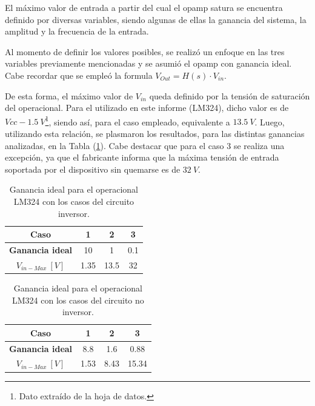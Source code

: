 El máximo valor de entrada a partir del cual el opamp satura se encuentra definido por diversas variables, siendo algunas de ellas la ganancia del sistema, la amplitud y la frecuencia de la entrada.

Al momento de definir los valores posibles, se realizó un enfoque en las tres variables previamente mencionadas y se asumió el opamp con ganancia ideal. Cabe recordar que se empleó la formula $ V_{Out}=H(s)\cdot V_{in} $.

De esta forma, el máximo valor de $V_{in}$ queda definido por la tensión de saturación del operacional. Para el utilizado en este informe (LM324), dicho valor es de $Vcc - 1.5 \ V$\footnote{Dato extraído de la hoja de datos.}, siendo así, para el caso empleado, equivalente a $13.5 \ V$. Luego, utilizando esta relación, se plasmaron los resultados, para las distintas ganancias analizadas, en la Tabla (\ref{tab:gananciaideal}). Cabe destacar que para el caso 3 se realiza una excepción, ya que el fabricante informa que la máxima tensión de entrada soportada por el dispositivo sin quemarse es de $32 \ V$.

\begin{table}[H]
\begin{center}
\label{tab:maxin}
\begin{tabular}{|c|c|c|c|}
\hline
\textbf{Caso}        & \textbf{1} & \textbf{2} & \textbf{3} \\ \hline
\textbf{Ganancia ideal}     & 10         & 1          & 0.1        \\ \hline
\textbf{$V_{in-Max} \ \left[ V \right]$} & 1.35       & 13.5       & 32         \\ \hline
\end{tabular}
\end{center}
\caption{Ganancia ideal para el operacional LM324 con los casos del circuito inversor.}
\label{tab:gananciaideal}
\end{table}

\begin{table}[H]
\begin{center}
\label{tab:maxin}
\begin{tabular}{|c|c|c|c|}
\hline
\textbf{Caso}        & \textbf{1} & \textbf{2} & \textbf{3} \\ \hline
\textbf{Ganancia ideal}     & 8.8         & 1.6          & 0.88        \\ \hline
\textbf{$V_{in-Max} \ \left[ V \right]$} & 1.53       & 8.43       & 15.34         \\ \hline
\end{tabular}
\end{center}
\caption{Ganancia ideal para el operacional LM324 con los casos del circuito no inversor.}
\label{tab:gananciaidealnoinv}
\end{table}

